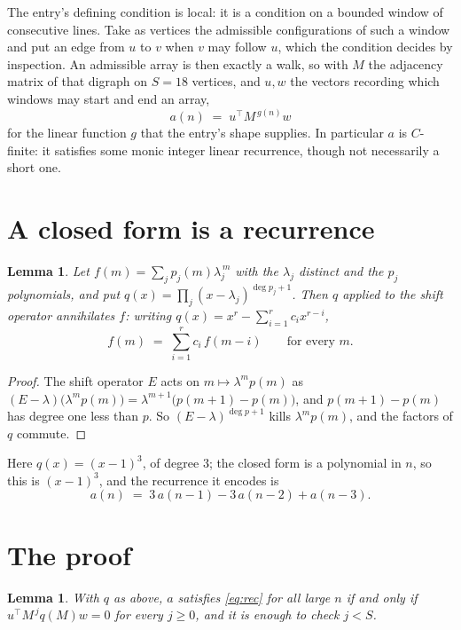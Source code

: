 \documentclass[11pt,a4paper]{article}
\theoremstyle{plain}
\newtheorem{lemma}[theorem]{Lemma}
\theoremstyle{definition}
\begin{document}
The entry's defining condition is local: it is a condition on a bounded window of consecutive lines. Take as vertices the
admissible configurations of such a window and put an edge from $u$ to $v$ when $v$ may
follow $u$, which the condition decides by inspection. An admissible array is then exactly a
walk, so with $M$ the adjacency matrix of that digraph on $S=18$ vertices, and $u,w$ the
vectors recording which windows may start and end an array,
\[
a(n)\;=\;u^{\!\top}M^{\,g(n)}w
\]
for the linear function $g$ that the entry's shape supplies. In particular $a$ is
$C$-finite: it satisfies some monic integer linear recurrence, though not necessarily a short
one.

\section{A closed form is a recurrence}

\begin{lemma}\label{lem:ann}
Let $f(m)=\sum_{j}p_j(m)\lambda_j^{\,m}$ with the $\lambda_j$ distinct and the $p_j$
polynomials, and put $q(x)=\prod_j(x-\lambda_j)^{\deg p_j+1}$. Then $q$ applied to the shift
operator annihilates $f$: writing $q(x)=x^{r}-\sum_{i=1}^{r}c_ix^{r-i}$,
\[
f(m)\;=\;\sum_{i=1}^{r}c_i\,f(m-i)\qquad\text{for every }m.
\]
\end{lemma}

\begin{proof}
The shift operator $E$ acts on $m\mapsto\lambda^{m}p(m)$ as
$(E-\lambda)\bigl(\lambda^{m}p(m)\bigr)=\lambda^{m+1}\bigl(p(m+1)-p(m)\bigr)$, and
$p(m+1)-p(m)$ has degree one less than $p$. So $(E-\lambda)^{\deg p+1}$ kills
$\lambda^{m}p(m)$, and the factors of $q$ commute.
\end{proof}

Here $q(x)=(x-1)^{3}$, of degree $3$; the closed form is a polynomial in $n$, so this is $(x-1)^{3}$, and the recurrence it encodes is
\begin{equation}\label{eq:rec}
a(n)\;=\;3\,a(n-1) - 3\,a(n-2) + a(n-3).
\end{equation}

\section{The proof}

\begin{lemma}\label{lem:crit}
With $q$ as above, $a$ satisfies \eqref{eq:rec} for all large $n$ if and only if
$u^{\!\top}M^{\,j}q(M)w=0$ for every $j\ge0$, and it is enough to check $j<S$.
\end{lemma}
\end{document}
